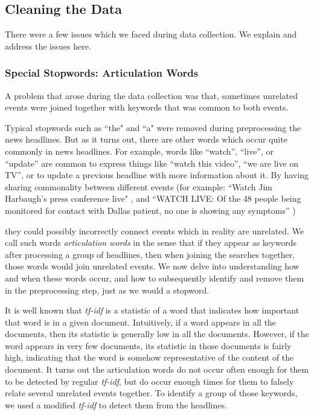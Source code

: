 \subsection{Cleaning the Data}
There were a few issues which we faced during data collection. We
explain and address the issues here.
\subsubsection{Special Stopwords:  Articulation Words}
A problem that arose during the data collection was that, sometimes
unrelated events were joined together with keywords that was common to
both events.  

Typical stopwords such as ``the" and ``a" were removed during preprocessing
the news headlines. But as it turns out, there are other words
which occur quite commonly in news headlines. For example, words like
``watch'', ``live'', or ``update'' are common to express things like
``watch this video'', ``we are live on TV'', or to update a previous
headline with more information about it. By having sharing commonality
between different
events (for example:  ``Watch Jim Harbaugh's press conference
live" \cite{Jim}, and ``WATCH LIVE: Of the 48 people being monitored for
contact with Dallas patient, no one is showing any symptoms'' \cite{dallas_patient})



they could possibly incorrectly connect events which in reality are
unrelated.  We call such words
\emph{articulation words} in the sense that if they appear as keywords
after processing a group of headlines, then when joining the searches
together, those words would join unrelated events.  We now delve into
understanding how and when these words occur, and how to subsequently
identify and remove them in the preprocessing step, just as we would a
stopword.

It is well known that \emph{tf-idf} \cite{Jones72astatistical} is a statistic of a word that
indicates how important that word is in a given document.  Intuitively, if a word appears
in all the documents, then its statistic is generally low in all the documents.  However,
if the word appears in very few documents, its statistic in those documents is fairly high,
indicating that the word is somehow representative of the content of the document.
It turns out the articulation words do not occur often enough for them to be detected by
regular \emph{tf-idf}, but do occur enough
times for them to falsely relate several unrelated events together. To
identify a group of those keywords, we used a modified \emph{tf-idf}
to detect them from the headlines.

